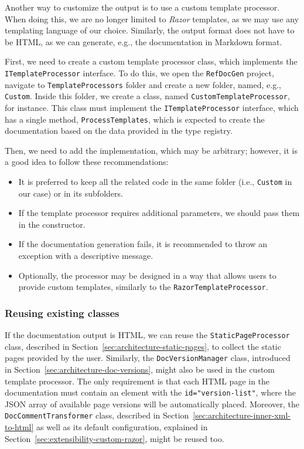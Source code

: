 Another way to customize the output is to use a custom template processor.
When doing this, we are no longer limited to \textit{Razor} templates, as we may use any templating language of our choice.
Similarly, the output format does not have to be HTML, as we can generate, e.g., the documentation in Markdown format.

First, we need to create a custom template processor class, which implements the 
\texttt{ITemplateProcessor} interface.
To do this, we open the \texttt{RefDocGen} project, navigate to \texttt{TemplateProcessors} folder and create a new folder, named, e.g., \texttt{Custom}.
Inside this folder, we create a class, named \texttt{CustomTemplateProcessor}, for instance.
This class must implement the \texttt{ITemplateProcessor} interface, which has a single method, \texttt{ProcessTemplates}, which is expected to create the documentation based on the data provided in the type registry.

Then, we need to add the implementation, which may be arbitrary; however, it is a good idea to follow these recommendations:

\begin{itemize}
    \item It is preferred to keep all the related code in the same folder (i.e., \texttt{Custom} in our case) or in its subfolders.
    \item If the template processor requires additional parameters, we should pass them in the constructor.
    \item If the documentation generation fails, it is recommended to throw an exception with a descriptive message.
    \item Optionally, the processor may be designed in a way that allows users to provide custom templates, similarly to the \texttt{RazorTemplateProcessor}.
\end{itemize}

\subsubsection{Reusing existing classes}

If the documentation output is HTML, we can reuse the \texttt{StaticPageProcessor} class, described in Section~\ref{sec:architecture-static-pages}, to collect the static pages provided by the user.
Similarly, the \texttt{DocVersionManager} class, introduced in Section~\ref{sec:architecture-doc-versions}, might also be used in the custom template processor.
The only requirement is that each HTML page in the documentation must contain an element with the
\texttt{id="version-list"}, where the JSON array of available page versions will
be automatically placed.
Moreover, the \texttt{DocCommentTransformer} class, described in Section~\ref{sec:architecture-inner-xml-to-html} as well as its default configuration, explained in Section~\ref{sec:extensibility-custom-razor}, might be reused too.

